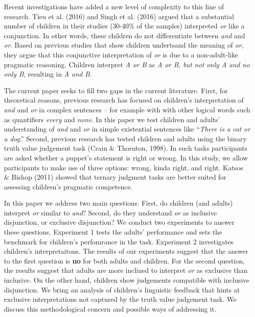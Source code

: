 \documentclass[10pt, letterpaper]{article}
\begin{document}
Recent investigations have added a new level of complexity to this line
of research. Tieu et al. (2016) and Singh et al. (2016) argued that a
substantial number of children in their studies (30-40\% of the samples)
interpreted \emph{or} like a conjunction. In other words, these children
do not differentiate between \emph{and} and \emph{or}. Based on previous
studies that show children undertsand the meaning of \emph{or}, they
argue that this conjunctive interpretation of \emph{or} is due to a
non-adult-like pragmatic reasoning. Children interpret \emph{A or B} as
\emph{A or B, but not only A and no only B}, resulting in \emph{A and
B}.

The current paper seeks to fill two gaps in the current literature.
First, for theoretical reasons, previous research has focused on
children's interpretation of \emph{and} and \emph{or} in complex
sentences -- for example with with other logical words such as
quantifiers \emph{every} and \emph{none}. In this paper we test children
and adults' understanding of \emph{and} and \emph{or} in simple
existential sentences like ``\emph{There is a cat or a dog}.'' Second,
previous research has tested children and adults using the binary truth
value judgement task (Crain \& Thornton, 1998). In such tasks
participants are asked whether a puppet's statement is right or wrong.
In this study, we allow participants to make use of three options:
wrong, kinda right, and right. Katsos \& Bishop (2011) showed that
ternary judgment tasks are better suited for assessing children's
pragmatic competence.

In this paper we address two main questions. First, do children (and
adults) interpret \emph{or} similar to \emph{and}? Second, do they
understand \emph{or} as inclusive disjunction, or exclusive disjunction?
We conduct two experiments to answer these questions. Experiment 1 tests
the adults' performance and sets the benchmark for children's
perfomrance in the task. Experiment 2 investigates children's
interpretaitons. The results of our experiments suggest that the answer
to the first question is \textbf{no} for both adults and children. For
the second question, the results suggest that adults are more inclined
to interpret \emph{or} as exclusive than inclusive. On the other hand,
children show judgements compatible with inclusive disjunction. We bring
an analysis of children's linguistic feedback that hints at exclusive
interpretations not captured by the truth value judgement task. We
discuss this methodological concern and possible ways of addressing it.
\end{document}
